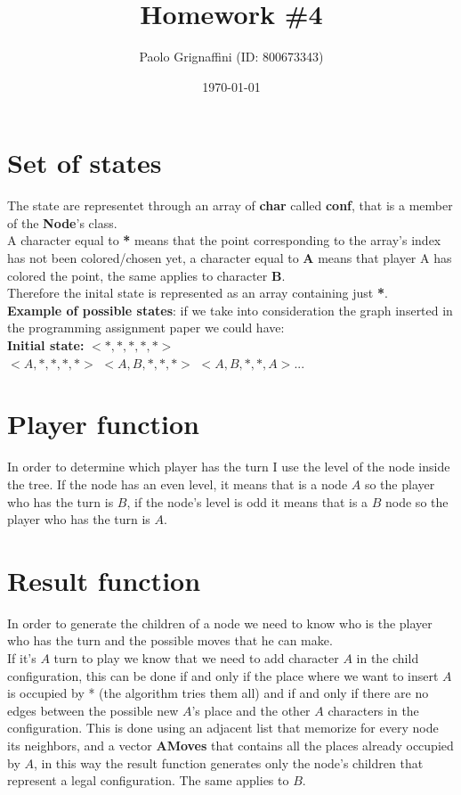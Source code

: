 \documentclass{article}
\title{Homework \#4}
\date{\today}
\author{Paolo Grignaffini (ID: 800673343)}
\begin{document}
	\maketitle
	
\section*{Set of states}
The state are representet through an array of \textbf{char} called \textbf{conf}, that is a member of the \textbf{Node}'s class.\\
A character equal to \textbf{*} means that the point corresponding to the array's index has not been colored/chosen yet, a character equal to \textbf{A} means that player A has colored the point, the same applies to character \textbf{B}.\\
Therefore the inital state is represented as an array containing just \textbf{*}.\\
\textbf{Example of possible states}: if we take into consideration the graph inserted in the programming assignment paper we could have:\\
\textbf{Initial state:} $<*,*,*,*,*>$\\
$<A,*,*,*,*>$ $<A,B,*,*,*>$ $<A,B,*,*,A>$...

\section*{Player function}
In order to determine which player has the turn I use the level of the node inside the tree. If the node has an even level, it means that is a node $A$ so the player who has the turn is $B$, if the node's level is odd it means that is a $B$ node so the player who has the turn is $A$.

\section*{Result function}
In order to generate the children of a node we need to know who is the player who has the turn and the possible moves that he can make.\\
If it's $A$ turn to play we know that we need to add character $A$ in the child configuration, this can be done if and only if the place where we want to insert $A$ is occupied by * (the algorithm tries them all) and if and only if there are no edges between the possible new $A$'s place and the other $A$ characters in the configuration. This is done using an adjacent list that memorize for every node its neighbors, and a vector \textbf{AMoves} that contains all the places already occupied by $A$, in this way the result function generates only the node's children that represent a legal configuration. The same applies to $B$.
\end{document}

